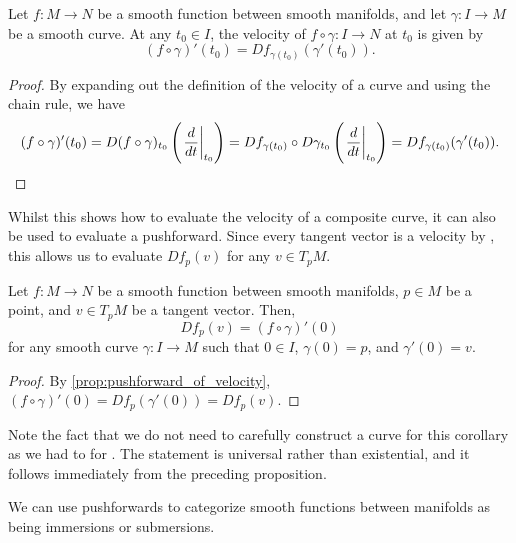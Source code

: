 \documentclass[a4paper,12pt]{article}
\begin{document}
\begin{proposition}\label{prop:pushforward_of_velocity}
    Let $f \colon M \to N$ be a smooth function between smooth manifolds, and let $\gamma \colon I \to M$ be a smooth curve.
    At any $t_0 \in I$, the velocity of $f \circ \gamma \colon I \to N$ at $t_0$ is given by
    \begin{equation}
        (f \circ \gamma)'(t_0) = Df_{\gamma(t_0)}(\gamma'(t_0)).
    \end{equation}
\end{proposition}
\begin{proof}
    By expanding out the definition of the velocity of a curve and using the chain rule, we have
    \begin{equation*}
        (f \circ \gamma)'(t_0) = D(f \circ \gamma)_{t_0}\left(\eval{\frac{d}{dt}}{t_0}\right) = Df_{\gamma(t_0)} \circ D\gamma_{t_0} \left(\eval{\frac{d}{dt}}{t_0}\right) = Df_{\gamma(t_0)}(\gamma'(t_0)). \qedhere
    \end{equation*}
\end{proof}
Whilst this shows how to evaluate the velocity of a composite curve, it can also be used to evaluate a pushforward.
Since every tangent vector is a velocity by , this allows us to evaluate $Df_p(v)$ for any $v \in T_p M$.
\begin{corollary}\label{cor:pushforward_formula_using_velocities}
    Let $f \colon M \to N$ be a smooth function between smooth manifolds, $p \in M$ be a point, and $v \in T_p M$ be a tangent vector.
    Then,
    \begin{equation}
        Df_p(v) = (f \circ \gamma)'(0)
    \end{equation}
    for any smooth curve $\gamma \colon I \to M$ such that $0 \in I$, $\gamma(0) = p$, and $\gamma'(0) = v$.
\end{corollary}
\begin{proof}
    By \cref{prop:pushforward_of_velocity}, $(f \circ \gamma)'(0) = Df_p(\gamma'(0)) = Df_p(v)$.
\end{proof}
\begin{remark}
    Note the fact that we do not need to carefully construct a curve for this corollary as we had to for .
    The statement is universal rather than existential, and it follows immediately from the preceding proposition.
\end{remark}
We can use pushforwards to categorize smooth functions between manifolds as being immersions or submersions.
\end{document}
